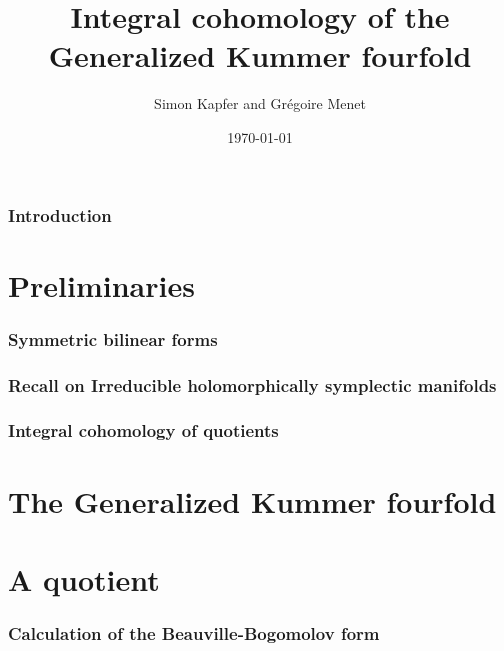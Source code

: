 \documentclass[a4paper]{article}
\begin{document}
\title{\bf Integral cohomology of the Generalized Kummer fourfold}


\author{Simon Kapfer and Gr\'egoire Menet}


\date{\today}

\maketitle
\section{Introduction}
\part{Preliminaries}
\section{Symmetric bilinear forms}



\section{Recall on Irreducible holomorphically symplectic manifolds}
\section{Integral cohomology of quotients}


\part{The Generalized Kummer fourfold}




\part{A quotient}
\section{Calculation of the Beauville-Bogomolov form}


\end{document}
